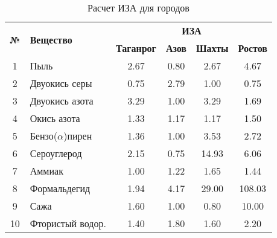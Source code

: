\begin{table}[H]
    \centering
    \caption{Расчет ИЗА для городов}
    \label{table:iza}
    \begin{tabularx}{\linewidth}{|c|X|c|c|c|c|}
        \hline
        \multirow{2}{*}{\textbf{№}} & \multirow{2}{*}{\textbf{Вещество}} & \multicolumn{4}{c|}{\textbf{ИЗА}}                                                    \\ \cline{3-6}
                                    &                                    & \textbf{Таганрог}                 & \textbf{Азов} & \textbf{Шахты} & \textbf{Ростов} \\ \hline
        1                           & Пыль                               & 2.67                              & 0.80          & 2.67           & 4.67            \\ \hline
        2                           & Двуокись серы                      & 0.75                              & 2.79          & 1.00           & 0.75            \\ \hline
        3                           & Двуокись азота                     & 3.29                              & 1.00          & 3.29           & 1.69            \\ \hline
        4                           & Окись азота                        & 1.33                              & 1.17          & 1.17           & 1.50            \\ \hline
        5                           & Бензо($\alpha$)пирен               & 1.36                              & 1.00          & 3.53           & 2.72            \\ \hline
        6                           & Сероуглерод                        & 2.15                              & 0.75          & 14.93          & 6.06            \\ \hline
        7                           & Аммиак                             & 1.00                              & 1.22          & 1.65           & 1.44            \\ \hline
        8                           & Формальдегид                       & 1.94                              & 4.17          & 29.00          & 108.03          \\ \hline
        9                           & Сажа                               & 1.60                              & 1.00          & 0.80           & 10.00           \\ \hline
        10                          & Фтористый водор.                   & 1.40                              & 1.80          & 1.60           & 2.20            \\ \hline

\end{tabularx}
\end{table}
